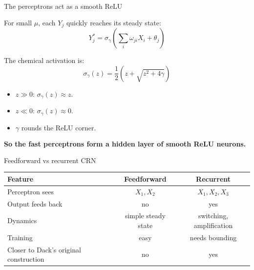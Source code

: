 \documentclass[aspectratio=169,11pt]{beamer}
\begin{document}
\begin{frame}{The perceptrons act as a smooth ReLU}

For small $\mu$, each $Y_j$ quickly reaches its steady state:
\begin{equation*}
    Y_j^* = \sigma_\gamma\left( \sum_i \omega_{ji} X_i + \theta_j \right)
\end{equation*}

\vspace{0.2cm}
The chemical activation is:
\begin{equation*}
    \sigma_\gamma(z) = \frac{1}{2}\left( z + \sqrt{z^2 + 4\gamma} \right)
\end{equation*}

\vspace{0.2cm}
\begin{itemize}
    \item $z \gg 0$: $\sigma_\gamma(z) \approx z$.
    \item $z \ll 0$: $\sigma_\gamma(z) \approx 0$.
    \item $\gamma$ rounds the ReLU corner.
\end{itemize}

\vspace{0.2cm}
\centering
\textbf{So the fast perceptrons form a hidden layer of smooth ReLU neurons.}

\end{frame}

\begin{frame}{Feedforward vs recurrent CRN}

\begin{table}
\centering
\begin{tabular}{lcc}
\toprule
\textbf{Feature} & \textbf{Feedforward} & \textbf{Recurrent} \\
\midrule
Perceptron sees & $X_1, X_2$ & $X_1, X_2, X_3$ \\
Output feeds back & no & yes \\
Dynamics & simple steady state & switching, amplification \\
Training & easy & needs bounding \\
Closer to Dack's original construction & no & yes \\
\bottomrule
\end{tabular}
\end{table}

\end{frame}
\end{document}
